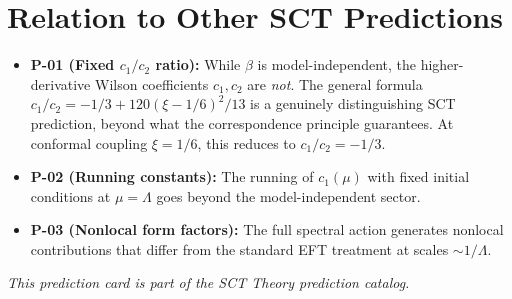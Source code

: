 \documentclass[11pt,a4paper]{article}
\begin{document}
\section{Relation to Other SCT Predictions}

\begin{itemize}[leftmargin=2em]
  \item \textbf{P-01 (Fixed $c_1/c_2$ ratio):} While $\beta$ is model-independent, the higher-derivative Wilson coefficients $c_1, c_2$ are \emph{not}. The general formula $c_1/c_2 = -1/3 + 120(\xi - 1/6)^2/13$ is a genuinely distinguishing SCT prediction, beyond what the correspondence principle guarantees. At conformal coupling $\xi = 1/6$, this reduces to $c_1/c_2 = -1/3$.
  \item \textbf{P-02 (Running constants):} The running of $c_1(\mu)$ with fixed initial conditions at $\mu = \Lambda$ goes beyond the model-independent sector.
  \item \textbf{P-03 (Nonlocal form factors):} The full spectral action generates nonlocal contributions that differ from the standard EFT treatment at scales $\sim 1/\Lambda$.
\end{itemize}

\vspace{1em}
\noindent
\textit{This prediction card is part of the SCT Theory prediction catalog.}
\end{document}
